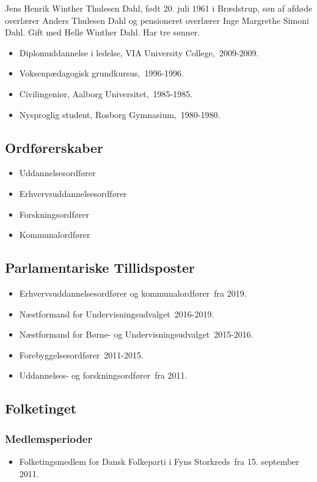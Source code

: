 \documentclass[11pt, a4paper]{awesome-cv}
\begin{document}
\makecvheader[R]
\makelettertitle
\begin{cvletter}
Jens Henrik Winther Thulesen Dahl, født 20. juli 1961 i Brædstrup, søn af afdøde overlærer Anders Thulesen Dahl og pensioneret overlærer Inge Margrethe Simoni Dahl. Gift med Helle Winther Dahl. Har tre sønner.

\begin{itemize}
\item Diplomuddannelse i ledelse, VIA University College, 2009-2009.
\item Voksenpædagogisk grundkursus, 1996-1996.
\item Civilingeniør, Aalborg Universitet, 1985-1985.
\item Nysproglig student, Rosborg Gymnasium, 1980-1980.
\end{itemize}
\subsection*{Ordførerskaber}
\begin{itemize}
\item Uddannelsesordfører
\item Erhvervsuddannelsesordfører
\item Forskningsordfører
\item Kommunalordfører
\end{itemize}
\subsection*{Parlamentariske Tillidsposter}
\begin{itemize}
\item Erhvervsuddannelsesordfører og kommunalordfører fra 2019.
\item Næstformand for Undervisningsudvalget 2016-2019.
\item Næstformand for Børne- og Undervisningsudvalget 2015-2016.
\item Forebyggelsesordfører 2011-2015.
\item Uddannelses- og forskningsordfører fra 2011.
\end{itemize}
\subsection*{Folketinget}
\subsubsection*{Medlemsperioder}
\begin{itemize}
\item Folketingsmedlem for Dansk Folkeparti i Fyns Storkreds fra 15. september 2011.
\end{itemize}

\end{cvletter}
\end{document}
